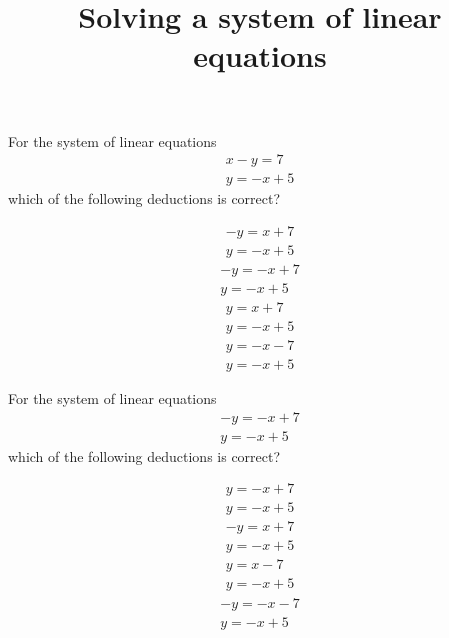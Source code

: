 \documentclass{webquiz}
\title{Solving a system of linear equations}
\begin{document}
\begin{question} %
For the system of linear equations
\begin{gather*} 
x-y=7\\
y=-x+5
\end{gather*}
which of the following deductions is correct?
\begin{choice}[columns=1] %
\incorrect
\begin{gather*} 
-y=x+7\\
y=-x+5
\end{gather*}
\correct
\begin{gather*} 
-y=-x+7\\
y=-x+5
\end{gather*}
\incorrect
\begin{gather*} 
y=x+7\\
y=-x+5
\end{gather*}
\incorrect
\begin{gather*} 
y=-x-7\\
y=-x+5
\end{gather*}
\end{choice}
\end{question}



\begin{question} %
For the system of linear equations
\begin{gather*} 
-y=-x+7\\
y=-x+5
\end{gather*}
which of the following deductions is correct?
\begin{choice}[columns=1] %
\incorrect
\begin{gather*} 
y=-x+7\\
y=-x+5
\end{gather*}
\incorrect
\begin{gather*} 
-y=x+7\\
y=-x+5
\end{gather*}
\correct
\begin{gather*} 
y=x-7\\
y=-x+5
\end{gather*}
\incorrect
\begin{gather*} 
-y=-x-7\\
y=-x+5
\end{gather*}
\end{choice}
\end{question}
\end{document}
